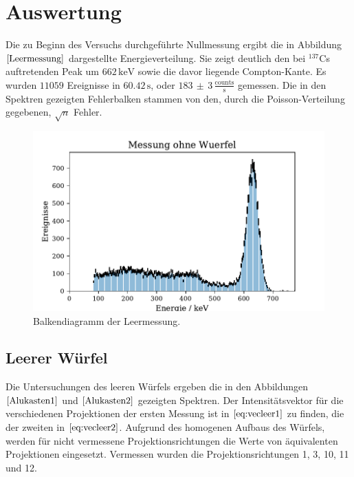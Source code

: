 \section{Auswertung}
Die zu Beginn des Versuchs durchgeführte Nullmessung ergibt die in Abbildung $\ref{Leermessung}$ dargestellte Energieverteilung. Sie zeigt deutlich den bei $^{137}$Cs auftretenden Peak um $662 \, \si{\kilo\electronvolt}$ sowie die davor liegende
Compton-Kante. Es wurden $11059$ Ereignisse in $60.42 \, \si{\second}$, oder $183 \,  \pm \, 3\, \frac{\text{counts}}{\si{\second}}$ gemessen.
Die in den Spektren gezeigten Fehlerbalken stammen von den, durch die Poisson-Verteilung gegebenen, $\sqrt{n}$ Fehler.
\begin{figure}[H]
  \centering
  \includegraphics{plots/leer.pdf}
  \caption{Balkendiagramm der Leermessung.}
  \label{Leermessung}
\end{figure}
\subsection{Leerer Würfel}
Die Untersuchungen des leeren Würfels ergeben die in den Abbildungen $\ref{Alukasten1}$ und $\ref{Alukasten2}$ gezeigten Spektren. Der Intensitätsvektor
für die verschiedenen Projektionen der ersten Messung ist in $\ref{eq:vecleer1}$ zu finden, die der zweiten in $\ref{eq:vecleer2}$.
Aufgrund des homogenen Aufbaus des Würfels,
werden für nicht vermessene Projektionsrichtungen die Werte von äquivalenten Projektionen eingesetzt.
Vermessen wurden die Projektionsrichtungen 1, 3, 10, 11 und 12.

